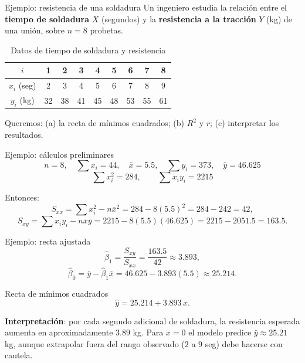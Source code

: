 \documentclass[aspectratio=169,11pt]{beamer}
\begin{document}
\begin{frame}{Ejemplo: resistencia de una soldadura}
Un ingeniero estudia la relación entre el \textbf{tiempo de soldadura} $X$ (segundos) y la \textbf{resistencia a la tracción} $Y$ (kg) de una unión, sobre $n=8$ probetas.

\begin{table}[htbp]
\centering
\begin{tabular}{c|cccccccc}
\toprule
$i$ & 1 & 2 & 3 & 4 & 5 & 6 & 7 & 8 \\
\midrule
$x_i$ (seg) & 2 & 3 & 4 & 5 & 6 & 7 & 8 & 9 \\
$y_i$ (kg) & 32 & 38 & 41 & 45 & 48 & 53 & 55 & 61 \\
\bottomrule
\end{tabular}
\caption{Datos de tiempo de soldadura y resistencia}
\end{table}

Queremos: (a) la recta de mínimos cuadrados; (b) $R^2$ y $r$; (c) interpretar los resultados.
\end{frame}

\begin{frame}{Ejemplo: cálculos preliminares}
\[
n=8,\quad \sum x_i = 44,\quad \bar x = 5.5, \quad \sum y_i = 373, \quad \bar y = 46.625
\]
\[
\sum x_i^2 = 284, \qquad \sum x_i y_i = 2215
\]

Entonces:
\[
S_{xx} = \sum x_i^2 - n\bar x^2 = 284 - 8(5.5)^2 = 284-242 = 42,
\]
\[
S_{xy} = \sum x_iy_i - n\bar x\bar y = 2215 - 8(5.5)(46.625) = 2215 - 2051.5 = 163.5.
\]
\end{frame}

\begin{frame}{Ejemplo: recta ajustada}
\[
\hat\beta_1 = \frac{S_{xy}}{S_{xx}} = \frac{163.5}{42} \approx 3.893,
\]
\[
\hat\beta_0 = \bar y - \hat\beta_1 \bar x = 46.625 - 3.893(5.5) \approx 25.214.
\]

\begin{alertblock}{Recta de mínimos cuadrados}
\[
\hat y = 25.214 + 3.893\, x.
\]
\end{alertblock}

\textbf{Interpretación}: por cada segundo adicional de soldadura, la resistencia esperada aumenta en aproximadamente $3.89$ kg. Para $x=0$ el modelo predice $\hat y \approx 25.21$ kg, aunque extrapolar fuera del rango observado ($2$ a $9$ seg) debe hacerse con cautela.
\end{frame}
\end{document}
